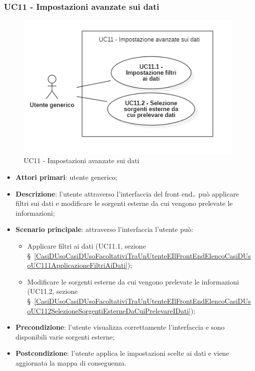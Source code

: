 \subsubsection{UC11 - Impostazioni avanzate sui dati}\label{CasiDUsoCasiDUsoFacoltativiTraUnUtenteEIlFrontEndElencoCasiDUsoUC11ImpostazioniAvanzateSuiDati}

\begin{center}
	\begin{figure}[H]
		\centering\includegraphics[scale=0.7]{../immagini/attori_casi/UC11_1.png}
		\caption{UC11 - Impostazioni avanzate sui dati}
	\end{figure}
\end{center}

\begin{itemize}
	\item \textbf{Attori primari}: utente generico;
	\item \textbf{Descrizione}: l'utente attraverso l'interfaccia del front end$_{\scaleto{G}{3pt}}$ può applicare filtri sui dati e modificare le sorgenti esterne da cui vengono prelevate le informazioni;
	\item \textbf{Scenario principale}: attraverso l'interfaccia l'utente può:
	\begin{itemize}
		\item Applicare filtri ai dati (UC11.1, sezione  \S~\ref{CasiDUsoCasiDUsoFacoltativiTraUnUtenteEIlFrontEndElencoCasiDUsoUC111ApplicazioneFiltriAiDati});
		\item Modificare le sorgenti esterne da cui vengono prelevate le informazioni (UC11.2, sezione \S~\ref{CasiDUsoCasiDUsoFacoltativiTraUnUtenteEIlFrontEndElencoCasiDUsoUC112SelezioneSorgentiEsterneDaCuiPrelevareIDati});
	\end{itemize}
	\item \textbf{Precondizione}: l'utente visualizza correttamente l'interfaccia e sono disponibili varie sorgenti esterne;
	\item \textbf{Postcondizione}: l'utente applica le impostazioni scelte ai dati e viene aggiornata la mappa di conseguenza.
\end{itemize}

